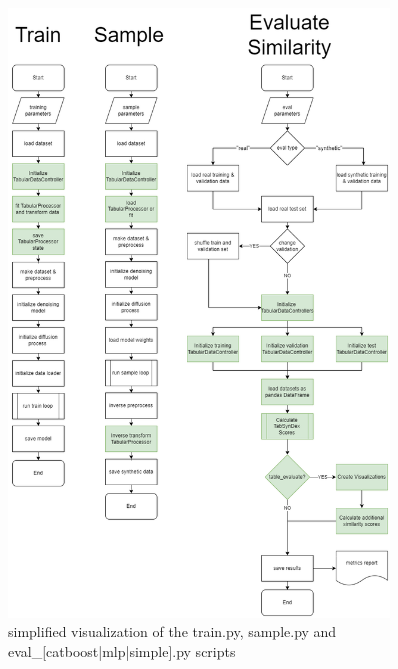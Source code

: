 \begin{figure}[H]
	\centering
	\includegraphics[width=0.9\textwidth]{images/train-sample-eval-Changed.png}
	\caption[Train, Sample, Evaluation Script Changes]{simplified visualization of the train.py, sample.py and eval\_[catboost|mlp|simple].py scripts}
	\label{fig:a_train_sample_eval}
\end{figure}


